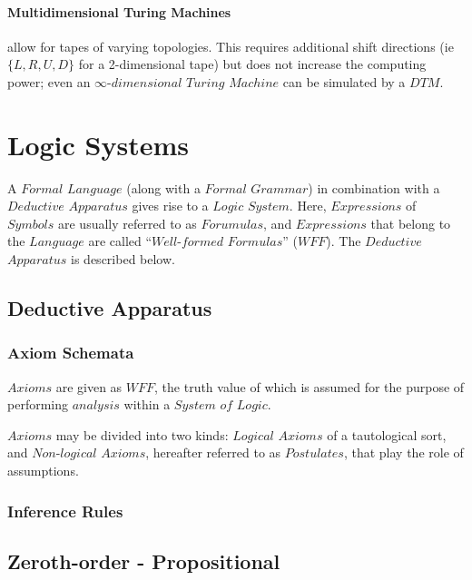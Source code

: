 \documentclass{article}
\begin{document}
\paragraph{Multidimensional Turing Machines} allow for tapes of
varying topologies. This requires additional shift directions (ie
$\{L, R, U, D\}$ for a 2-dimensional tape) but does not increase the
computing power; even an $\infty$-$dimensional$ $Turing$ $Machine$ can
be simulated by a $DTM$.


\section{Logic Systems}

A $Formal$ $Language$ (along with a $Formal$ $Grammar$) in combination
with a $Deductive$ $Apparatus$ gives rise to a $Logic$ $System$. Here,
$Expressions$ of $Symbols$ are usually referred to as $Forumulas$, and
$Expressions$ that belong to the $Language$ are called
``$Well$-$formed$ $Formulas$'' ($WFF$). The $Deductive$ $Apparatus$ is
described below.

\subsection{Deductive Apparatus}

\subsubsection{Axiom Schemata}

$Axioms$ are given as $WFF$, the truth value of which is
assumed for the purpose of performing $analysis$ within a $System$
$of$ $Logic$.

$Axioms$ may be divided into two kinds: $Logical$ $Axioms$ of a
tautological sort, and $Non$-$logical$ $Axioms$, hereafter referred to
as $Postulates$, that play the role of assumptions.



\subsubsection{Inference Rules}

\subsection{Zeroth-order - Propositional}
\end{document}
